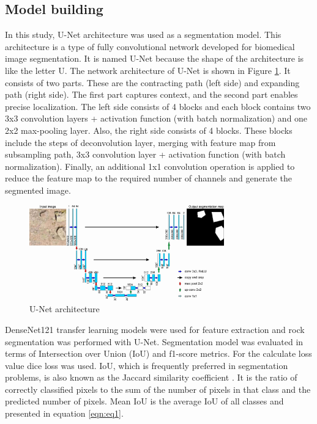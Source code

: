 \documentclass[a4paper,fleqn]{cas-sc}
\begin{document}
\subsection{Model building}
In this study, U-Net architecture \citep{ronneberger2015u} was used as a segmentation model. This architecture is a type of fully convolutional network developed for biomedical image segmentation. It is named U-Net because the shape of the architecture is like the letter U. The network architecture of U-Net is shown in Figure \ref{fig:Figure5}. It consists of two parts. These are the contracting path (left side) and expanding path (right side). The first part captures context, and the second part enables precise localization. The left side consists of 4 blocks and each block contains two 3x3 convolution layers + activation function (with batch normalization) and one 2x2 max-pooling layer. Also, the right side consists of 4 blocks. These blocks include the steps of deconvolution layer, merging with feature map from subsampling path, 3x3 convolution layer + activation function (with batch normalization). Finally, an additional 1x1 convolution operation is applied to reduce the feature map to the required number of channels and generate the segmented image.
\begin{figure}
	\centering
	\includegraphics[width=0.75\textwidth]{figures/fig5.jpg}
	\caption{U-Net architecture}
	\label{fig:Figure5}
\end{figure}

DenseNet121 transfer learning models were used for feature extraction and rock segmentation was performed with U-Net. Segmentation model was evaluated in terms of Intersection over Union (IoU) and f1-score metrics. For the calculate loss value dice loss was used. IoU, which is frequently preferred in segmentation problems, is also known as the Jaccard similarity coefficient \citep{jaccard1912distribution}. It is the ratio of correctly classified pixels to the sum of the number of pixels in that class and the predicted number of pixels. Mean IoU is the average IoU of all classes and presented in equation \ref{eqn:eq1}. 
\end{document}
